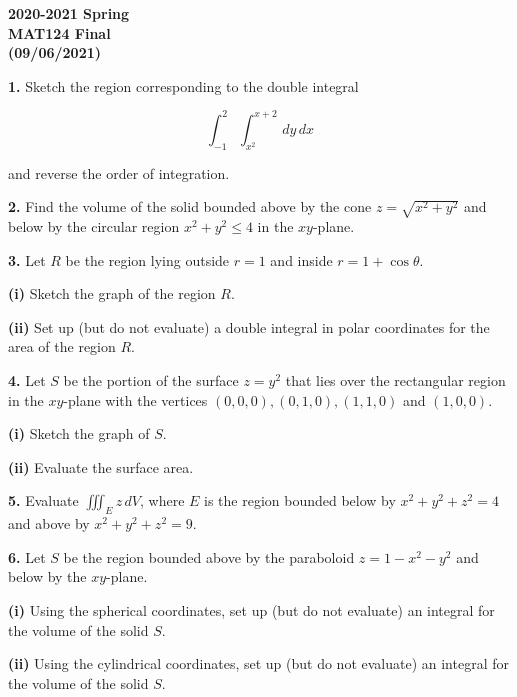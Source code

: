 \documentclass{article}
\begin{document}
\pagestyle{empty}
\large

\begin{center}
\textbf{2020-2021 Spring \\MAT124 Final\\(09/06/2021)}
\end{center}

\textbf{1.} Sketch the region corresponding to the double integral

\[\int_{-1}^2\int_{x^2}^{x+2}\,dy\,dx\]

and reverse the order of integration.

\vspace{1em}

\textbf{2.} Find the volume of the solid bounded above by the cone $z=\sqrt{x^2+y^2}$ and below by the circular region $x^2+y^2\leq4$ in the $xy$-plane.

\vspace{1em}

\textbf{3.} Let $R$ be the region lying outside $r=1$ and inside $r=1+\cos\theta$.

\textbf{(i)} Sketch the graph of the region $R$.

\textbf{(ii)} Set up (but do not evaluate) a double integral in polar coordinates for the area of the region $R$.

\vspace{1em}

\textbf{4.} Let $S$ be the portion of the surface $z=y^2$ that lies over the rectangular region in the $xy$-plane with the vertices $(0,0,0), (0,1,0), (1,1,0)$ and $(1,0,0)$.

\textbf{(i)} Sketch the graph of $S$.

\textbf{(ii)} Evaluate the surface area.

\vspace{1em}

\textbf{5.} Evaluate $\displaystyle \iiint_E z\,dV$, where $E$ is the region bounded below by $x^2+y^2+z^2=4$ and above by $x^2+y^2+z^2=9$.

\vspace{1em}

\textbf{6.} Let $S$ be the region bounded above by the paraboloid $z=1-x^2-y^2$ and below by the $xy$-plane.

\textbf{(i)} Using the spherical coordinates, set up (but do not evaluate) an integral for the volume of the solid $S$.

\textbf{(ii)} Using the cylindrical coordinates, set up (but do not evaluate) an integral for the volume of the solid $S$.
\end{document}

